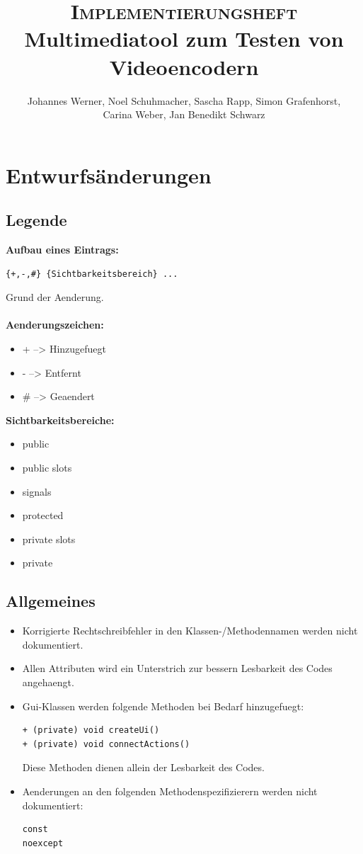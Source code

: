 \documentclass[parskip=full]{scrartcl}
\title{\fontsize{40}{48} \selectfont \textsc{Implementierungsheft}\\
{\fontsize{18}{18} \selectfont Multimediatool zum Testen von Videoencodern}}}
\author {Johannes Werner, Noel Schuhmacher, Sascha Rapp, Simon Grafenhorst,\\
Carina Weber, Jan Benedikt Schwarz}
\begin{document}
\maketitle
\thispagestyle{empty}
\newpage
\tableofcontents
\newpage
\section{Entwurfsänderungen}
\subsection{Legende}
\textbf{Aufbau eines Eintrags:}
\begin{verbatim}
{+,-,#} {Sichtbarkeitsbereich} ...
\end{verbatim}
Grund der Aenderung.\\
\\
\textbf{Aenderungszeichen:}
\begin{itemize}
\item[] + \hspace{5mm}-->\hspace{5mm} Hinzugefuegt
\item[] - \hspace{5mm}-->\hspace{5mm} Entfernt
\item[] \# \hspace{5mm}-->\hspace{5mm} Geaendert
\end{itemize}
\textbf{Sichtbarkeitsbereiche:}
\begin{itemize}
\item public
\item public slots
\item signals
\item protected
\item private slots
\item private
\end{itemize}
\newpage
\subsection{Allgemeines}
\begin{itemize}
\item Korrigierte Rechtschreibfehler in den Klassen-/Methodennamen werden nicht dokumentiert. 
\item Allen Attributen wird ein Unterstrich zur bessern Lesbarkeit des Codes angehaengt.
\item Gui-Klassen werden folgende Methoden bei Bedarf hinzugefuegt:
\begin{verbatim}
+ (private) void createUi()
+ (private) void connectActions()
\end{verbatim}
Diese Methoden dienen allein der Lesbarkeit des Codes.

\item Aenderungen an den folgenden Methodenspezifizierern werden nicht dokumentiert:
\begin{verbatim}
const
noexcept
\end{verbatim}

\end{itemize}
\newpage
\end{document}
